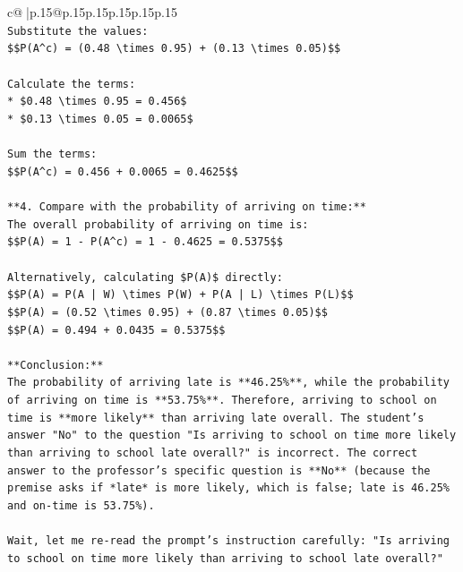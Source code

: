 \documentclass{article}
\begin{document}
{\begin{supertabular}{c@{$\;$}|p{.15\linewidth}@{}p{.15\linewidth}p{.15\linewidth}p{.15\linewidth}p{.15\linewidth}p{.15\linewidth}}
{{{\\ 
\texttt{Substitute the values:} \\
\texttt{\$\$P(A\^{}c) = (0.48 \textbackslash{}times 0.95) + (0.13 \textbackslash{}times 0.05)\$\$} \\
\\ 
\texttt{Calculate the terms:} \\
\texttt{*   \$0.48 \textbackslash{}times 0.95 = 0.456\$} \\
\texttt{*   \$0.13 \textbackslash{}times 0.05 = 0.0065\$} \\
\\ 
\texttt{Sum the terms:} \\
\texttt{\$\$P(A\^{}c) = 0.456 + 0.0065 = 0.4625\$\$} \\
\\ 
\texttt{**4. Compare with the probability of arriving on time:**} \\
\texttt{The overall probability of arriving on time is:} \\
\texttt{\$\$P(A) = 1 {-} P(A\^{}c) = 1 {-} 0.4625 = 0.5375\$\$} \\
\\ 
\texttt{Alternatively, calculating \$P(A)\$ directly:} \\
\texttt{\$\$P(A) = P(A | W) \textbackslash{}times P(W) + P(A | L) \textbackslash{}times P(L)\$\$} \\
\texttt{\$\$P(A) = (0.52 \textbackslash{}times 0.95) + (0.87 \textbackslash{}times 0.05)\$\$} \\
\texttt{\$\$P(A) = 0.494 + 0.0435 = 0.5375\$\$} \\
\\ 
\texttt{**Conclusion:**} \\
\texttt{The probability of arriving late is **46.25\%**, while the probability of arriving on time is **53.75\%**. Therefore, arriving to school on time is **more likely** than arriving late overall. The student's answer "No" to the question "Is arriving to school on time more likely than arriving to school late overall?" is incorrect. The correct answer to the professor's specific question is **No** (because the premise asks if *late* is more likely, which is false; late is 46.25\% and on{-}time is 53.75\%).} \\
\\ 
\texttt{Wait, let me re{-}read the prompt's instruction carefully: "Is arriving to school on time more likely than arriving to school late overall?"} \\
\\ 
}}}
\end{supertabular}}
\end{document}
